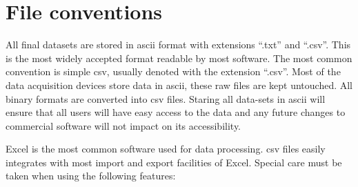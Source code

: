 \documentclass{nwureport}
\begin{document}
\section{File conventions}

All final datasets are stored in \gls{ascii} format with extensions
``.txt'' and ``.csv''. This is the most
widely accepted format readable by most software. The most common
convention is simple \gls{csv}, usually denoted with the extension
``.csv''. Most of the data acquisition devices
store data in \gls{ascii}, these raw files are kept untouched. All
binary formats are converted into \gls{csv} files. Staring all
data-sets in \gls{ascii} will ensure that all users will have easy
access to the data and any future changes to commercial software will
not impact on its accessibility.

Excel is the most common software used for data processing. \gls{csv}
files easily integrates with most import and export facilities of
Excel. Special care must be taken when using the following features:
\end{document}
